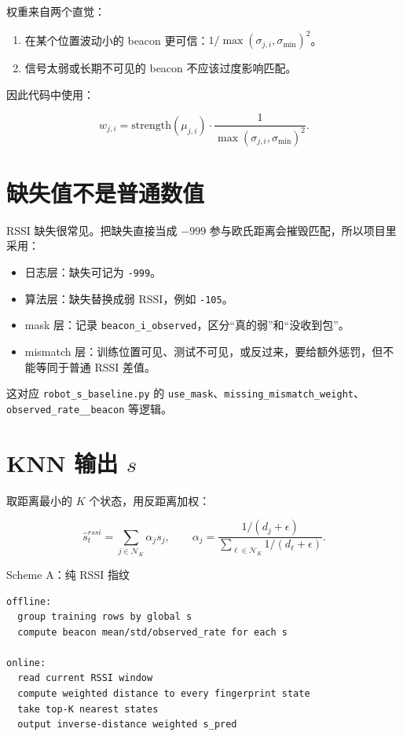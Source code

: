 \documentclass[11pt,a4paper,openany]{report}
\newcommand{\code}[1]{\nolinkurl{#1}}
\newcommand{\file}[1]{\nolinkurl{#1}}
\newcommand{\csvcol}[1]{\nolinkurl{#1}}
\begin{document}
权重来自两个直觉：

\begin{enumerate}
  \item 在某个位置波动小的 beacon 更可信：\(1/\max(\sigma_{j,i},\sigma_{\min})^2\)。
  \item 信号太弱或长期不可见的 beacon 不应该过度影响匹配。
\end{enumerate}

因此代码中使用：

\[
  w_{j,i}
  =
  \text{strength}(\mu_{j,i})
  \cdot
  \frac{1}{\max(\sigma_{j,i}, \sigma_{\min})^2}.
\]

\section{缺失值不是普通数值}

RSSI 缺失很常见。把缺失直接当成 \(-999\) 参与欧氏距离会摧毁匹配，所以项目里采用：

\begin{itemize}
  \item 日志层：缺失可记为 \code{-999}。
  \item 算法层：缺失替换成弱 RSSI，例如 \code{-105}。
  \item mask 层：记录 \csvcol{beacon_i_observed}，区分“真的弱”和“没收到包”。
  \item mismatch 层：训练位置可见、测试不可见，或反过来，要给额外惩罚，但不能等同于普通 RSSI 差值。
\end{itemize}

这对应 \file{robot_s_baseline.py} 的 \code{use_mask}、\code{missing_mismatch_weight}、\code{observed_rate__beacon} 等逻辑。

\section{KNN 输出 \(s\)}

取距离最小的 \(K\) 个状态，用反距离加权：

\[
  \hat{s}_t^{rssi}
  =
  \sum_{j \in \mathcal{N}_K}
  \alpha_j s_j,
  \qquad
  \alpha_j =
  \frac{1/(d_j+\epsilon)}{\sum_{\ell\in\mathcal{N}_K}1/(d_\ell+\epsilon)}.
\]

\begin{algobox}{Scheme A：纯 RSSI 指纹}
\begin{lstlisting}
offline:
  group training rows by global s
  compute beacon mean/std/observed_rate for each s

online:
  read current RSSI window
  compute weighted distance to every fingerprint state
  take top-K nearest states
  output inverse-distance weighted s_pred
\end{lstlisting}
\end{algobox}
\end{document}
